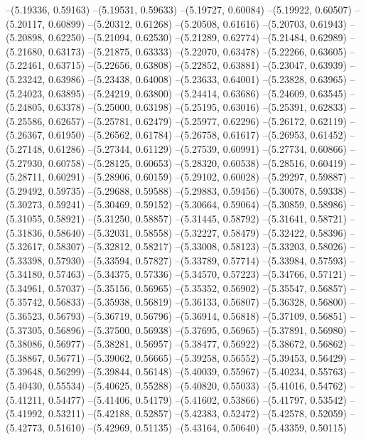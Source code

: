 --(5.19336, 0.59163)
--(5.19531, 0.59633)
--(5.19727, 0.60084)
--(5.19922, 0.60507)
--(5.20117, 0.60899)
--(5.20312, 0.61268)
--(5.20508, 0.61616)
--(5.20703, 0.61943)
--(5.20898, 0.62250)
--(5.21094, 0.62530)
--(5.21289, 0.62774)
--(5.21484, 0.62989)
--(5.21680, 0.63173)
--(5.21875, 0.63333)
--(5.22070, 0.63478)
--(5.22266, 0.63605)
--(5.22461, 0.63715)
--(5.22656, 0.63808)
--(5.22852, 0.63881)
--(5.23047, 0.63939)
--(5.23242, 0.63986)
--(5.23438, 0.64008)
--(5.23633, 0.64001)
--(5.23828, 0.63965)
--(5.24023, 0.63895)
--(5.24219, 0.63800)
--(5.24414, 0.63686)
--(5.24609, 0.63545)
--(5.24805, 0.63378)
--(5.25000, 0.63198)
--(5.25195, 0.63016)
--(5.25391, 0.62833)
--(5.25586, 0.62657)
--(5.25781, 0.62479)
--(5.25977, 0.62296)
--(5.26172, 0.62119)
--(5.26367, 0.61950)
--(5.26562, 0.61784)
--(5.26758, 0.61617)
--(5.26953, 0.61452)
--(5.27148, 0.61286)
--(5.27344, 0.61129)
--(5.27539, 0.60991)
--(5.27734, 0.60866)
--(5.27930, 0.60758)
--(5.28125, 0.60653)
--(5.28320, 0.60538)
--(5.28516, 0.60419)
--(5.28711, 0.60291)
--(5.28906, 0.60159)
--(5.29102, 0.60028)
--(5.29297, 0.59887)
--(5.29492, 0.59735)
--(5.29688, 0.59588)
--(5.29883, 0.59456)
--(5.30078, 0.59338)
--(5.30273, 0.59241)
--(5.30469, 0.59152)
--(5.30664, 0.59064)
--(5.30859, 0.58986)
--(5.31055, 0.58921)
--(5.31250, 0.58857)
--(5.31445, 0.58792)
--(5.31641, 0.58721)
--(5.31836, 0.58640)
--(5.32031, 0.58558)
--(5.32227, 0.58479)
--(5.32422, 0.58396)
--(5.32617, 0.58307)
--(5.32812, 0.58217)
--(5.33008, 0.58123)
--(5.33203, 0.58026)
--(5.33398, 0.57930)
--(5.33594, 0.57827)
--(5.33789, 0.57714)
--(5.33984, 0.57593)
--(5.34180, 0.57463)
--(5.34375, 0.57336)
--(5.34570, 0.57223)
--(5.34766, 0.57121)
--(5.34961, 0.57037)
--(5.35156, 0.56965)
--(5.35352, 0.56902)
--(5.35547, 0.56857)
--(5.35742, 0.56833)
--(5.35938, 0.56819)
--(5.36133, 0.56807)
--(5.36328, 0.56800)
--(5.36523, 0.56793)
--(5.36719, 0.56796)
--(5.36914, 0.56818)
--(5.37109, 0.56851)
--(5.37305, 0.56896)
--(5.37500, 0.56938)
--(5.37695, 0.56965)
--(5.37891, 0.56980)
--(5.38086, 0.56977)
--(5.38281, 0.56957)
--(5.38477, 0.56922)
--(5.38672, 0.56862)
--(5.38867, 0.56771)
--(5.39062, 0.56665)
--(5.39258, 0.56552)
--(5.39453, 0.56429)
--(5.39648, 0.56299)
--(5.39844, 0.56148)
--(5.40039, 0.55967)
--(5.40234, 0.55763)
--(5.40430, 0.55534)
--(5.40625, 0.55288)
--(5.40820, 0.55033)
--(5.41016, 0.54762)
--(5.41211, 0.54477)
--(5.41406, 0.54179)
--(5.41602, 0.53866)
--(5.41797, 0.53542)
--(5.41992, 0.53211)
--(5.42188, 0.52857)
--(5.42383, 0.52472)
--(5.42578, 0.52059)
--(5.42773, 0.51610)
--(5.42969, 0.51135)
--(5.43164, 0.50640)
--(5.43359, 0.50115)
